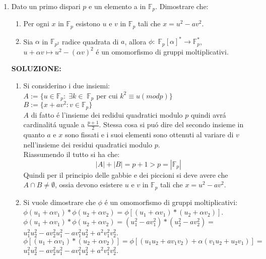 \documentclass[a4paper]{article}
\newcommand{\ds}{\displaystyle}
\begin{document}
\begin{enumerate}
\item Dato un primo dispari $p$ e un elemento a in $\mathbb{F}_p$. Dimostrare che:
\begin{enumerate}
\item Per ogni $x$ in $\mathbb{F}_p$ esistono $u$ e $v$ in $\mathbb{F}_p$ tali che $x=u^2-av^2$.
\item Sia $\alpha$ in $\mathbb{F}_{p^2}$ radice quadrata di $a$, allora $\phi:\;\mathbb{F}_p[\alpha]^*\longrightarrow \mathbb{F}_p^*$, $u+\alpha v\longmapsto u^2-(\alpha v)^2$ \'e un omomorfismo di gruppi moltiplicativi.\\
\end{enumerate}
\textbf{SOLUZIONE:}\\
\begin{enumerate}
\item Si considerino i due insiemi:\\ 
$A:=\{u\in\mathbb{F}_p : \;\exists k\in\;\mathbb{F}_p$ per cui $k^2\equiv u(mod p)\}$\\
$B:=\{x+av^2: v\in\mathbb{F}_p\}$\\
$A$ di fatto \'e l'insieme dei redidui quadratici modulo $p$ quindi avr\'a cardinalit\'a uguale a 
$\ds{\frac{p+1}{2}}$. Stessa cosa si pu\'o dire del secondo insieme in quanto $a$ e $x$ sono fissati e i suoi elementi sono ottenuti al variare di $v$ nell'insieme dei residui quadratici modulo $p$.\\
Riassumendo il tutto si ha che:
$$|A|+|B|=p+1>p=|\mathbb{F}_p|$$
Quindi per il principio delle gabbie e dei piccioni si deve avere che $A\cap B \neq \emptyset$, ossia devono esistere $u$ e $v$ in $\mathbb{F}_p$ tali che $x=u^2-av^2$.\\

 
\item Si vuole dimostrare che $\phi$ \'e un omomorfismo di gruppi moltiplicativi:
$\phi(u_1+\alpha v_1)*\phi (u_2+\alpha v_2)=\phi[(u_1+\alpha v_1)*(u_2+\alpha v_2)]$.\\
$\phi(u_1+\alpha v_1)*\phi (u_2+\alpha v_2)=(u_1^2-av_1^2)*(u_2^2-av_2^2)=$\\
$u_1^2u_2^2-av_2^2u_1^2-av_1^2u_2^2+a^2v_1^2v_2^2$.\\
$\phi[(u_1+\alpha v_1)*(u_2+\alpha v_2)]=\phi[(u_1u_2+av_1v_2)+\alpha(v_1u_2+u_2v_1)]=$\\
$u_1^2u_2^2-av_2^2u_1^2-av_1^2u_2^2+a^2v_1^2v_2^2$.\\

\end{enumerate}
\end{enumerate}
\end{document}
